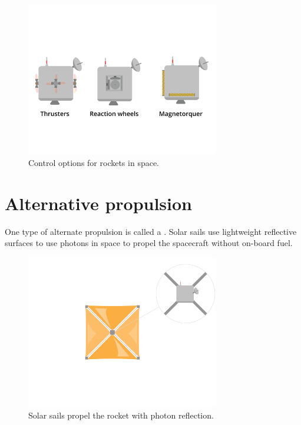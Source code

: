 	\begin{figure}[htbp]
		\centering
		\includegraphics[width=0.75\textwidth]{controlSpace.png}
		\caption{Control options for rockets in space.}
		\label{fig:atmosspace}
	\end{figure}
	


\section{Alternative propulsion}

One type of alternate propulsion is called a . Solar sails use lightweight reflective surfaces to use photons in space to propel the spacecraft without on-board fuel.

\begin{figure}[htbp]
    \centering
	\includegraphics[width=0.75\textwidth]{solarSail.png}
    \caption{Solar sails propel the rocket with photon reflection.}
    \label{fig:solarSail}
\end{figure}

